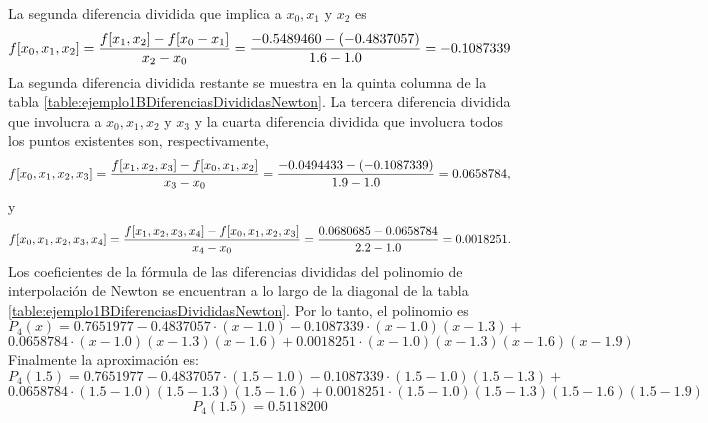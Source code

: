 \begin{exerciseT}
	La segunda diferencia dividida que implica a $x_0, x_1$ y $x_2$ es
	$$f[x_0,x_1,x_2] = {f[x_1,x_2]-f[x_0-x_1]\over x_2-x_0} = {-0.5489460-(-0.4837057)\over 1.6 - 1.0} = -0.1087339$$
	La segunda diferencia dividida restante se muestra en la quinta columna de la tabla \ref{table:ejemplo1BDiferenciasDivididasNewton}. La tercera diferencia
	dividida que involucra a $x_0, x_1, x_2$ y $x_3$ y la cuarta diferencia dividida que involucra todos los puntos existentes son, respectivamente,
	$$f[x_0,x_1,x_2,x_3] = {f[x_1,x_2,x_3]-f[x_0,x_1,x_2]\over x_3-x_0} = {-0.0494433-(-0.1087339)\over 1.9-1.0} = 0.0658784,$$
	y
	$$f[x_0,x_1,x_2,x_3,x_4] = {f[x_1,x_2,x_3,x_4]-f[x_0,x_1,x_2,x_3]\over x_4-x_0} = {0.0680685-0.0658784\over 2.2-1.0} = 0.0018251.$$
	Los coeficientes de la fórmula de las diferencias divididas del polinomio de interpolación de Newton se encuentran a lo largo de la diagonal 
	de la tabla \ref{table:ejemplo1BDiferenciasDivididasNewton}. Por lo tanto, el polinomio es
	$$P_4(x) = 0.7651977 - 0.4837057\cdot(x-1.0) - 0.1087339\cdot(x-1.0)(x-1.3) + $$
	$$0.0658784\cdot(x-1.0)(x-1.3)(x-1.6) + 0.0018251\cdot(x-1.0)(x-1.3)(x-1.6)(x-1.9)$$
	Finalmente la aproximación es:
	$$P_4(1.5) = 0.7651977 - 0.4837057\cdot(1.5-1.0) - 0.1087339\cdot(1.5-1.0)(1.5-1.3) + $$
	$$0.0658784\cdot(1.5-1.0)(1.5-1.3)(1.5-1.6) + 0.0018251\cdot(1.5-1.0)(1.5-1.3)(1.5-1.6)(1.5-1.9)$$
	$$P_4(1.5) = 0.5118200$$ 
\end{exerciseT}
\hrulefill\\

